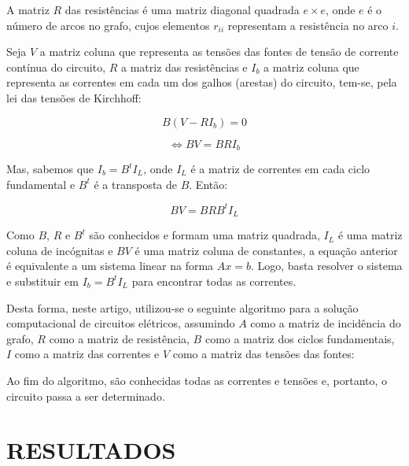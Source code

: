 \documentclass[twocolumn, 10pt,a4paper]{extarticle}
\begin{document}
A matriz $R$ das resistências é uma matriz diagonal quadrada $e \times e$, onde $e$ é o número de arcos no grafo, cujos elementos $r_{ii}$ representam a resistência no arco $i$.

Seja $V$ a matriz coluna que representa as tensões das fontes de tensão de corrente contínua do circuito, $R$ a matriz das resistências e $I_b$ a matriz coluna que representa as correntes em cada um dos galhos (arestas) do circuito, tem-se, pela lei das tensões de Kirchhoff:

\[
B(V -RI_b) = 0
\]

\[
\iff 
 BV = BRI_b  
\]

Mas, sabemos que $I_b = B^tI_L$, onde $I_L$ é a matriz de correntes em cada ciclo fundamental e $B^t$ é a transposta de $B$. Então:

\[
BV = BRB^tI_L
\]

Como $B$, $R$ e $B^t$ são conhecidos e formam uma matriz quadrada, $I_L$ é uma matriz coluna de incógnitas e $BV$ é uma matriz coluna de constantes, a equação anterior é equivalente a um sistema linear na forma $Ax = b$. Logo, basta resolver o sistema e substituir em $I_b = B^tI_L$ para encontrar todas as correntes.

Desta forma, neste artigo, utilizou-se o seguinte algoritmo para a solução computacional de circuitos elétricos, assumindo $A$ como a matriz de incidência do grafo, $R$ como a matriz de resistência, $B$ como a matriz dos ciclos fundamentais, $I$ como a matriz das correntes e $V$ como a matriz das tensões das fontes:

\begingroup
{}\label{cs}
\begin{algorithmic}[1]
	\Else
	\EndIf
\EndFunction
\end{algorithmic}
\hrulefill
\endgroup

Ao fim do algoritmo, são conhecidas todas as correntes e tensões e, portanto, o circuito passa a ser determinado.


\section{RESULTADOS}
\end{document}
